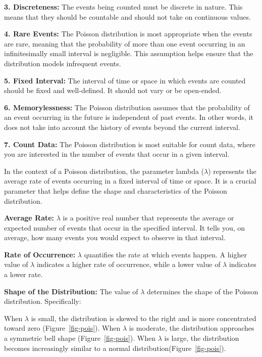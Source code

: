 \documentclass[
  a4paper,
]{scrbook}
\begin{document}
\textbf{3. Discreteness:} The events being counted must be discrete in
nature. This means that they should be countable and should not take on
continuous values.

\textbf{4. Rare Events:} The Poisson distribution is most appropriate
when the events are rare, meaning that the probability of more than one
event occurring in an infinitesimally small interval is negligible. This
assumption helps ensure that the distribution models infrequent events.

\textbf{5. Fixed Interval:} The interval of time or space in which
events are counted should be fixed and well-defined. It should not vary
or be open-ended.

\textbf{6. Memorylessness:} The Poisson distribution assumes that the
probability of an event occurring in the future is independent of past
events. In other words, it does not take into account the history of
events beyond the current interval.

\textbf{7. Count Data:} The Poisson distribution is most suitable for
count data, where you are interested in the number of events that occur
in a given interval.

In the context of a Poisson distribution, the parameter lambda
(\(\lambda\)) represents the average rate of events occurring in a fixed
interval of time or space. It is a crucial parameter that helps define
the shape and characteristics of the Poisson distribution.

\textbf{Average Rate:} \(\lambda\) is a positive real number that
represents the average or expected number of events that occur in the
specified interval. It tells you, on average, how many events you would
expect to observe in that interval.

\textbf{Rate of Occurrence:} \(\lambda\) quantifies the rate at which
events happen. A higher value of \(\lambda\) indicates a higher rate of
occurrence, while a lower value of \(\lambda\) indicates a lower rate.

\textbf{Shape of the Distribution:} The value of \(\lambda\) determines
the shape of the Poisson distribution. Specifically:

When \(\lambda\) is small, the distribution is skewed to the right and
is more concentrated toward zero (Figure~\ref{fig-pois}). When
\(\lambda\) is moderate, the distribution approaches a symmetric bell
shape (Figure~\ref{fig-pois}). When \(\lambda\) is large, the
distribution becomes increasingly similar to a normal
distribution(Figure~\ref{fig-pois}).
\end{document}
